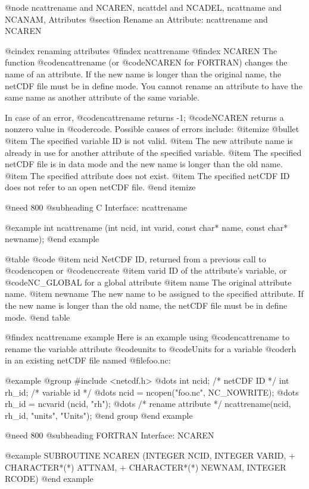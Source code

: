 {@node ncattrename and NCAREN, ncattdel and NCADEL, ncattname and NCANAM, Attributes
@section Rename an Attribute:  ncattrename and NCAREN

@cindex renaming attributes
@findex ncattrename
@findex NCAREN
The function @code{ncattrename} (or @code{NCAREN} for FORTRAN) changes the
name of an attribute.  If the new name is longer than the original name,
the netCDF file must be in define mode.  You cannot rename an attribute to
have the same name as another attribute of the same variable.

In case of an error, @code{ncattrename} returns -1; @code{NCAREN} returns a
nonzero value in @code{rcode}.  Possible causes of errors include:
@itemize @bullet
@item
The specified variable ID is not valid.
@item
The new attribute name is already in use for another attribute of the
specified variable.
@item
The specified netCDF file is in data mode and the new name is longer
than the old name.
@item
The specified attribute does not exist.
@item
The specified netCDF ID does not refer to an open netCDF file.
@end itemize

@need 800
@subheading C Interface:  ncattrename

@example
int ncattrename (int ncid, int varid, const char* name, const char* newname);
@end example

@table @code
@item ncid
NetCDF ID, returned from a previous call to @code{ncopen} or @code{nccreate}
@item varid
ID of the attribute's variable, or @code{NC_GLOBAL} for a
global attribute
@item name
The original attribute name.
@item newname
The new name to be assigned to the specified attribute.  If the new name
is longer than the old name, the netCDF file must be in define mode.
@end table

@findex ncattrename example
Here is an example using @code{ncattrename} to rename the variable
attribute @code{units} to @code{Units} for a variable @code{rh}
in an existing netCDF file named @file{foo.nc}:

@example
@group
#include <netcdf.h>
   @dots{}
int  ncid;        /* netCDF ID */
int  rh_id;       /* variable id */
   @dots{}
ncid = ncopen("foo.nc", NC_NOWRITE);
   @dots{}
rh_id = ncvarid (ncid, "rh");
   @dots{}
/* rename attribute */
ncattrename(ncid, rh_id, "units", "Units");
@end group
@end example

@need 800
@subheading FORTRAN Interface:  NCAREN

@example
      SUBROUTINE NCAREN (INTEGER NCID, INTEGER VARID,
     +                   CHARACTER*(*) ATTNAM,
     +                   CHARACTER*(*) NEWNAM, INTEGER RCODE)
@end example

}
